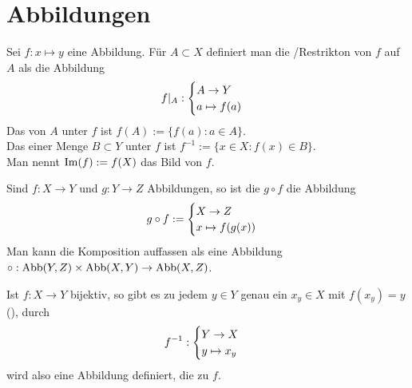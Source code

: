 \section{Abbildungen}

\begin{definition}[Einschränkung]
	Sei $f: x \mapsto y$ eine Abbildung. Für $A \subset X$
	definiert man die /Restrikton von $f$ auf $A$ als die Abbildung 
	\begin{align}
		f \vert_A:\begin{cases}
		A \to Y \\ a \mapsto f(a)
		\end{cases}\notag
	\end{align}
	Das  von $A$ unter $f$ ist $f(A) := \{f(a): a \in A\}$. \\
	Das  einer Menge $B \subset Y$ unter $f$ ist $f^{-1} := \{x \in X: f(x) \in B\}$. \\
	Man nennt $\operatorname{Im}(f) := f(X)$ das Bild von $f$.
\end{definition}

\begin{definition}[Komposition]
	Sind $f: X \to Y$ und $g: Y \to Z$ Abbildungen, so ist die
	 $g \circ f$ die Abbildung
	\begin{align}
		g \circ f := \begin{cases}
		X \to Z \\ x \mapsto f(g(x))
		\end{cases}\notag
	\end{align} Man kann 
	die Komposition auffassen als eine Abbildung $\circ: \operatorname{Abb}(Y,Z) \times \operatorname{Abb}(X,Y) \to \operatorname{Abb}(X,Z)$.
\end{definition}

\begin{definition}[Umkehrabbildung]
	Ist $f: X \to Y$ bijektiv, so gibt es zu jedem $y \in Y$
	genau ein $x_y \in X$ mit $f(x_y)=y$ (), durch 
	\begin{align}
		f^{-1}: \begin{cases}
		Y \to X \\ y \mapsto x_y
		\end{cases}\notag
	\end{align} wird also eine 
	Abbildung definiert, die  zu $f$. 
\end{definition}

